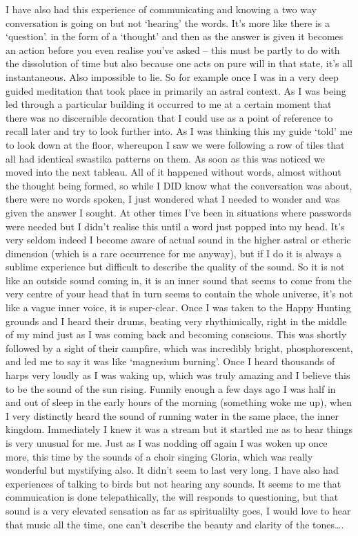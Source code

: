 \begin{footnotesize}
\begin{sffamily}
I have also had this experience of communicating and knowing a two way conversation is going on but not `hearing' the words. It's more like there is a `question'. in the form of a `thought' and then as the answer is given it becomes an action before you even realise you've asked – this must be partly to do with the dissolution of time but also because one acts on pure will in that state, it's all instantaneous. Also impossible to lie. So for example once I was in a very deep guided meditation that took place in primarily an astral context. As I was being led through a particular building it occurred to me at a certain moment that there was no discernible decoration that I could use as a point of reference to recall later and try to look further into. As I was thinking this my guide `told' me to look down at the floor, whereupon I saw we were following a row of tiles that all had identical swastika patterns on them. As soon as this was noticed we moved into the next tableau. All of it happened without words, almost without the thought being formed, so while I DID know what the conversation was about, there were no words spoken, I just wondered what I needed to wonder and was given the answer I sought. At other times I've been in situations where passwords were needed but I didn't realise this until a word just popped into my head. It's very seldom indeed I become aware of actual sound in the higher astral or etheric dimension (which is a rare occurrence for me anyway), but if I do it is always a sublime experience but difficult to describe the quality of the sound. So it is not like an outside sound coming in, it is an inner sound that seems to come from the very centre of your head that in turn seems to contain the whole universe, it's not like a vague inner voice, it is super-clear. Once I was taken to the Happy Hunting grounds and I heard their drums, beating very rhythimically, right in the middle of my mind just as I was coming back and becoming conscious. This was shortly followed by a sight of their campfire, which was incredibly bright, phosphorescent, and led me to say it was like `magnesium burning'. Once I heard thousands of harps very loudly as I was waking up, which was truly amazing and I believe this to be the sound of the sun rising. Funnily enough a few days ago I was half in and out of sleep in the early hours of the morning (something woke me up), when I very distinctly heard the sound of running water in the same place, the inner kingdom. Immediately I knew it was a stream but it startled me as to hear things is very unusual for me. Just as I was nodding off again I was woken up once more, this time by the sounds of a choir singing Gloria, which was really wonderful but mystifying also. It didn't seem to last very long. I have also had experiences of talking to birds but not hearing any sounds. It seems to me that commuication is done telepathically, the will responds to questioning, but that sound is a very elevated sensation as far as spiritualilty goes, I would love to hear that music all the time, one can't describe the beauty and clarity of the tones….



\end{sffamily}
\end{footnotesize}
